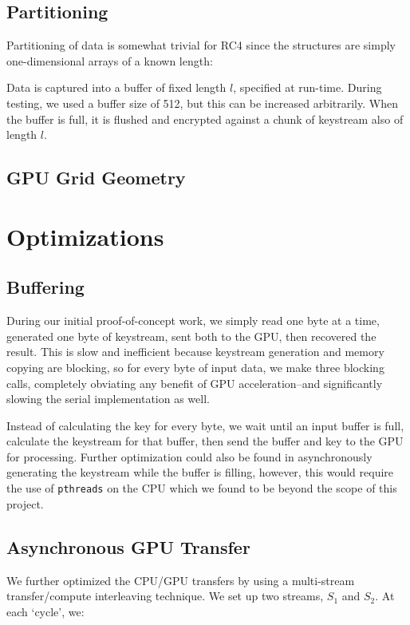 \documentclass[twocolumn]{article}
\begin{document}
  \subsection{Partitioning}
  Partitioning of data is somewhat trivial for RC4 since the structures are simply one-dimensional arrays of a known length:
  
  Data is captured into a buffer of fixed length $l$, specified at run-time. During testing, we used a buffer size of 512, but this can be increased arbitrarily. When the buffer is full, it is flushed and encrypted against a chunk of keystream also of length $l$.
  
  
  \subsection{GPU Grid Geometry}
  
  
  \section{Optimizations}
  \subsection{Buffering}
  During our initial proof-of-concept work, we simply read one byte at a time, generated one byte of keystream, sent both to the GPU, then recovered the result. This is slow and inefficient because keystream generation and memory copying are blocking, so for every byte of input data, we make three blocking calls, completely obviating any benefit of GPU acceleration--and significantly slowing the serial implementation as well.
  
  Instead of calculating the key for every byte, we wait until an input buffer is full, calculate the keystream for that buffer, then send the buffer and key to the GPU for processing. Further optimization could also be found in asynchronously generating the keystream while the buffer is filling, however, this would require the use of \texttt{pthreads} on the CPU which we found to be beyond the scope of this project.
  
  \subsection{Asynchronous GPU Transfer}
  
  We further optimized the CPU/GPU transfers by using a multi-stream transfer/compute interleaving technique\cite{gpu-conf}. We set up two streams, $S_1$ and $S_2$. At each `cycle', we:
  
\end{document}
